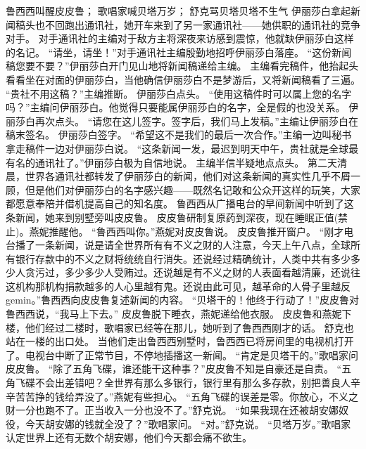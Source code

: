 \documentclass[a4paper,12pt,UTF8,twoside]{ctexbook}
\begin{document}
        鲁西西叫醒皮皮鲁；  
        歌唱家喊贝塔万岁；  
        舒克骂贝塔贝塔不生气    
        伊丽莎白拿起新闻稿头也不回跑出通讯社，她开车来到了另一家通讯社——她供职的通讯社的竞争对手。  
        对手通讯社的主编对于敌方主将深夜来访感到震惊，他就缺伊丽莎白这样的名记。  
        “请坐，请坐！”对手通讯社主编殷勤地招呼伊丽莎白落座。  
        “这份新闻稿您要不要？”伊丽莎白开门见山地将新闻稿递给主编。  
        主编看完稿件，他抬起头看看坐在对面的伊丽莎白，当他确信伊丽莎白不是梦游后，又将新闻稿看了三遍。  
        “贵社不用这稿？”主编推断。  
        伊丽莎白点头。  
        “使用这稿件时可以属上您的名字吗？”主编问伊丽莎白。他觉得只要能属伊丽莎白的名字，全是假的也没关系。  
        伊丽莎白再次点头。  
        “请您在这儿签字。签字后，我们马上发稿。”主编让伊丽莎白在稿末签名。  
        伊丽莎白签字。  
        “希望这不是我们的最后一次合作。”主编一边叫秘书拿走稿件一边对伊丽莎白说。  
        “这条新闻一发，最迟到明天中午，贵社就是全球最有名的通讯社了。”伊丽莎白极为自信地说。  
        主编半信半疑地点点头。  
        第二天清晨，世界各通讯社都转发了伊丽莎白的新闻，他们对这条新闻的真实性几乎不屑一顾，但是他们对伊丽莎白的名字感兴趣——既然名记敢和公众开这样的玩笑，大家都愿意奉陪并借机提高自己的知名度。  
        鲁西西从广播电台的早间新闻中听到了这条新闻，她来到别墅旁叫皮皮鲁。  
        皮皮鲁研制复原药到深夜，现在睡眠正值(禁止)。燕妮推醒他。        
        “鲁西西叫你。”燕妮对皮皮鲁说。  
        皮皮鲁推开窗户。  
        “刚才电台播了一条新闻，说是请全世界所有有不义之财的人注意，今天上午八点，全球所有银行存款中的不义之财将统统自行消失。还说经过精确统计，人类中共有多少多少人贪污过，多少多少人受贿过。还说越是有不义之财的人表面看越清廉，还说往这机构那机构捐款越多的人心里越有鬼。还说由此可见，越革命的人骨子里越反gemin。”鲁西西向皮皮鲁复述新闻的内容。  
        “贝塔干的！他终于行动了！”皮皮鲁对鲁西西说，“我马上下去。”  
        皮皮鲁脱下睡衣，燕妮递给他衣服。  
        皮皮鲁和燕妮下楼，他们经过二楼时，歌唱家已经等在那儿，她听到了鲁西西刚才的话。  
        舒克也站在一楼的出口处。  
        当他们走出鲁西西别墅时，鲁西西已将房间里的电视机打开了。电视台中断了正常节目，不停地插播这一新闻。  
        “肯定是贝塔干的。”歌唱家问皮皮鲁。  
        “除了五角飞碟，谁还能干这种事？”皮皮鲁不知是自豪还是自责。  
        “五角飞碟不会出差错吧？全世界有那么多银行，银行里有那么多存款，别把善良人辛辛苦苦挣的钱给弄没了。”燕妮有些担心。  
        “五角飞碟的误差是零。你放心，不义之财一分也跑不了。正当收入一分也没不了。”舒克说。  
        “如果我现在还被胡安娜奴役，今天胡安娜的钱就全没了？”歌唱家问。  
        “对。”舒克说。  
        “贝塔万岁。”歌唱家认定世界上还有无数个胡安娜，他们今天都会痛不欲生。  
\end{document}
